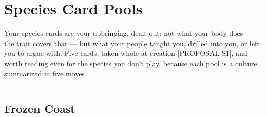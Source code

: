 %
%

\chapter{Species Card Pools}

Your species cards are your upbringing, dealt out: not what your body does --- the trait covers that --- but what your people taught you, drilled into you, or left you to argue with. Five cards, taken whole at creation [PROPOSAL S1], and worth reading even for the species you don't play, because each pool is a culture summarized in five moves.

\medskip\hrule\medskip

\section{Frozen Coast}


